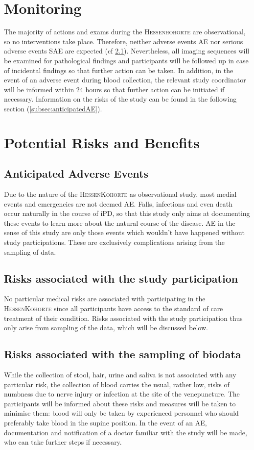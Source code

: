 \section{Monitoring}
The majority of actions and exams during the \textsc{Hessenhohorte} are observational, so no interventions take place. Therefore, neither adverse events \ac{AE} nor serious adverse events \ac{SAE} are expected (cf \ref{subsec:anticipated_AE}). Nevertheless, all imaging sequences will be examined for pathological findings and participants will be followed up in case of incidental findings so that further action can be taken. In addition, in the event of an adverse event during blood collection, the relevant study coordinator will be informed within 24 hours so that further action can be initiated if necessary. Information on the risks of the study can be found in the following section (\ref{subsec:anticipatedAE}).  

\section{Potential Risks and Benefits}
\subsection{Anticipated Adverse Events}
\label{subsec:anticipated_AE}
Due to the nature of the \textsc{HessenKohorte} as observational study, most medial events and emergencies are not deemed \acl{AE}. Falls, infections and even death occur naturally in the course of \ac{iPD}, so that this study only aims at documenting these events to learn more about the natural course of the disease. \ac{AE} in the sense of this study are only those events which wouldn't have happened without study participations. These are exclusively complications arising from the sampling of data.

\subsection{Risks associated with the study participation}
No particular medical risks are associated with participating in the \textsc{HessenKohorte} since all participants have access to the standard of
care treatment of their condition. Risks associated with the study participation thus only arise from sampling of the data, which will be
discussed below.

\subsection{Risks associated with the sampling of biodata}
While the collection of stool, hair, urine and saliva is not associated with any particular risk, the collection of blood carries the usual, rather low, risks of numbness due to nerve injury or infection at the site of the venepuncture. The participants will be informed about these risks and measures will be taken to minimise them: blood will only be taken by experienced personnel who should preferably take blood in the supine position. In the event of an \ac{AE}, documentation and notification of a doctor familiar with the study will be made, who can take further steps if necessary. 

